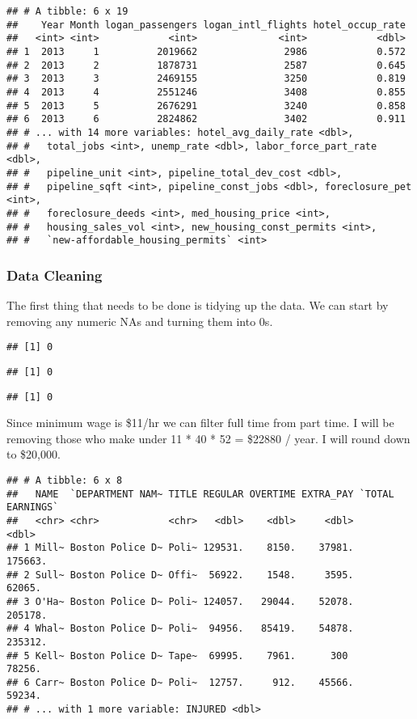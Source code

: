 \documentclass[]{article}
\begin{document}
\begin{verbatim}
## # A tibble: 6 x 19
##    Year Month logan_passengers logan_intl_flights hotel_occup_rate
##   <int> <int>            <int>              <int>            <dbl>
## 1  2013     1          2019662               2986            0.572
## 2  2013     2          1878731               2587            0.645
## 3  2013     3          2469155               3250            0.819
## 4  2013     4          2551246               3408            0.855
## 5  2013     5          2676291               3240            0.858
## 6  2013     6          2824862               3402            0.911
## # ... with 14 more variables: hotel_avg_daily_rate <dbl>,
## #   total_jobs <int>, unemp_rate <dbl>, labor_force_part_rate <dbl>,
## #   pipeline_unit <int>, pipeline_total_dev_cost <dbl>,
## #   pipeline_sqft <int>, pipeline_const_jobs <dbl>, foreclosure_pet <int>,
## #   foreclosure_deeds <int>, med_housing_price <int>,
## #   housing_sales_vol <int>, new_housing_const_permits <int>,
## #   `new-affordable_housing_permits` <int>
\end{verbatim}

\newpage

\subsubsection{Data Cleaning}\label{data-cleaning}

The first thing that needs to be done is tidying up the data. We can
start by removing any numeric NAs and turning them into 0s.

\begin{verbatim}
## [1] 0
\end{verbatim}

\begin{verbatim}
## [1] 0
\end{verbatim}

\begin{verbatim}
## [1] 0
\end{verbatim}

Since minimum wage is \$11/hr we can filter full time from part time. I
will be removing those who make under 11 * 40 * 52 = \$22880 / year. I
will round down to \$20,000.

\begin{verbatim}
## # A tibble: 6 x 8
##   NAME  `DEPARTMENT NAM~ TITLE REGULAR OVERTIME EXTRA_PAY `TOTAL EARNINGS`
##   <chr> <chr>            <chr>   <dbl>    <dbl>     <dbl>            <dbl>
## 1 Mill~ Boston Police D~ Poli~ 129531.    8150.    37981.          175663.
## 2 Sull~ Boston Police D~ Offi~  56922.    1548.     3595.           62065.
## 3 O'Ha~ Boston Police D~ Poli~ 124057.   29044.    52078.          205178.
## 4 Whal~ Boston Police D~ Poli~  94956.   85419.    54878.          235312.
## 5 Kell~ Boston Police D~ Tape~  69995.    7961.      300            78256.
## 6 Carr~ Boston Police D~ Poli~  12757.     912.    45566.           59234.
## # ... with 1 more variable: INJURED <dbl>
\end{verbatim}
\end{document}
